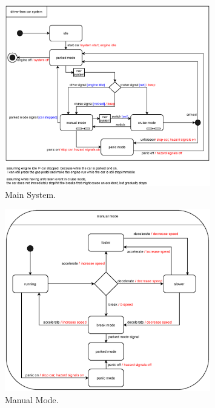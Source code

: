 \documentclass[12pt]{article}
\begin{document}
\begin{spacing}{1.5}
\begin{figure}[h!]
	\centering
		\includegraphics[width=0.8\textwidth]{./A2_Figures/A2_SOEN331_Main.eps}
		  \caption{Main System.}
  \label{fig:main-system-fig}
\end{figure}

\begin{figure}[h!]
	\centering
		\includegraphics[width=0.8\textwidth]{./A2_Figures/A2_SOEN331_Manual.eps}
		  \caption{Manual Mode.}
  \label{fig:manual-mode-fig}
\end{figure}  
   

\end{spacing}
\end{document}
